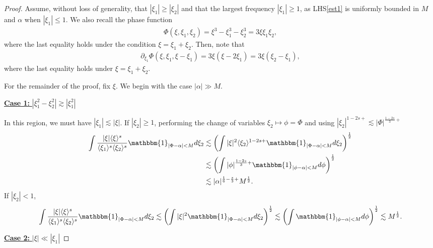 \documentclass[%
11pt,  reqno]{amsart}
\newcommand{\fia}{\mathbbm{1}_{|\Phi-\alpha|<M}}
\newcommand{\jap}[1]{\langle #1 \rangle}
\newcommand{\5}{\textup{V}}
\newcommand{\noi}{\noindent}
\theoremstyle{remark}
\newcommand{\al}{\alpha}
\numberwithin{equation}{section}
\numberwithin{theorem}{section}
\begin{document}
\begin{proof}
Assume, without loss of generality, that $|\xi_1|\ge |\xi_2|$ and that the largest frequency $|\xi_1| \ge 1$, as LHS\eqref{est1} is uniformly bounded in $M$ and $\al$ when $|\xi_1| \le 1$. We also recall the phase function 
\begin{align}
\label{phase2}
\Phi (\xi, \xi_1, \xi_2) = \xi^3 - \xi_1^3 - \xi_2^3 = 3 \xi \xi_1 \xi_2, 
\end{align}
where the last equality holds under the condition $\xi= \xi_1 + \xi_2$. Then, note that
\begin{align}
\label{phase2a}
\partial_{\xi_1} \Phi(\xi, \xi_1,\xi-\xi_1) 
= 
3 \xi (\xi -2 \xi_1)
= 
3 \xi(\xi_2 - \xi_1)
, 
\end{align}
where the last equality holds under $\xi = \xi_1+\xi_2$. 



For the remainder of the proof, fix $\xi$. We begin with the case $|\alpha|\gg M$.

\smallskip

\noi
\underline{
\textbf{Case 1:} $|\xi_1^2-\xi_2^2| \gtrsim |\xi_1^2|$}

In this region, we must have $|\xi_1|\lesssim |\xi|$. If $|\xi_2|\ge 1$, performing the change of variables $\xi_2\mapsto \phi=\Phi$ and using $|\xi_2|^{1-2s+}\lesssim |\Phi|^{\frac{1-2s}{3}+}$
\begin{align*}
     \int \frac{|\xi|\jap{\xi}^s}{\jap{\xi_1}^s\jap{\xi_2}^s}\fia d\xi_2 &\lesssim \left(\int |\xi|^2\jap{\xi_2}^{1-2s+}\fia d\xi_2\right)^\frac12\\&\lesssim \left(\int |\phi|^{\frac{1-2s}{3}+}\mathbbm{1}_{|\phi-\alpha|<M} d\phi\right)^\frac12\\&\lesssim |\alpha|^{\frac16 - \frac s3 +} M^{\frac12}.
\end{align*}
If $|\xi_2|<1$,
\begin{align*}
     \int \frac{|\xi|\jap{\xi}^s}{\jap{\xi_1}^s\jap{\xi_2}^s}\fia d\xi_2 \lesssim \left(\int |\xi|^2\fia d\xi_2\right)^\frac12\lesssim \left(\int \mathbbm{1}_{|\phi-\alpha|<M} d\phi\right)^\frac12\lesssim M^{\frac12}.
\end{align*}

\smallskip

\noi
\underline{ 
\textbf{Case 2:} $|\xi| \ll |\xi_1|$} 


\end{proof}
\end{document}
